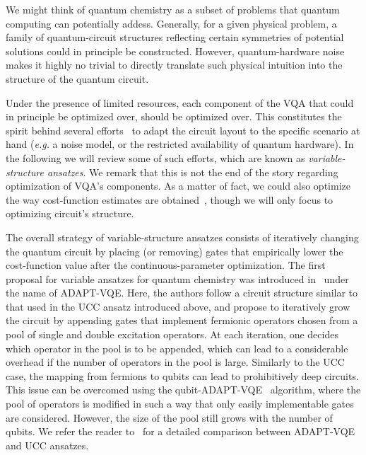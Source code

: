We might think of quantum chemistry as a subset of problems that quantum computing can potentially addess. Generally, for a given physical problem, a family of quantum-circuit structures reflecting certain symmetries of potential solutions could in principle be constructed. However, quantum-hardware noise makes it highly no trivial to directly translate such physical intuition into the structure of the quantum circuit. %
\vspace{1cm}

Under the presence of limited resources, each component of the VQA that could in principle be optimized over, should be optimized over. This constitutes the spirit behind several efforts~\cite{grimsley2019adaptive,tang2019qubit,zhang2021mutual, rattew2019domain,chivilikhin2020mog, cincio2021machine, cincio2018learning,du2020quantum,zhang2020differentiable} to adapt the circuit layout to the specific scenario at hand (\textit{e.g.} a noise model, or the restricted availability of quantum hardware). In the following we will review some of such efforts, which are known as \textit{variable-structure ansatzes}. We remark that this is not the end of the story regarding optimization of VQA's components. As a matter of fact, we could also optimize the way cost-function estimates are obtained~\cite{algorithmiq1,algorithmiq2}, though we will only focus to optimizing circuit's structure.

The overall strategy of variable-structure ansatzes consists of iteratively changing the quantum circuit by placing (or removing) gates that empirically lower the cost-function value after the continuous-parameter optimization. The first proposal for variable ansatzes for quantum chemistry was introduced in~\cite{grimsley2019adaptive} under the name of ADAPT-VQE. Here, the authors follow a circuit structure similar to that used in the UCC ansatz introduced above, and propose to iteratively grow the circuit by appending gates that implement fermionic operators chosen from a pool of single and double excitation operators. At each iteration, one decides which operator in the pool is to be appended, which can lead to a considerable overhead if the number of operators in the pool is large. Similarly to the UCC case, the mapping from fermions to qubits can lead to prohibitively deep circuits. This issue can be overcomed using the qubit-ADAPT-VQE~\cite{tang2019qubit} algorithm, where the pool of operators is modified in such a way that only easily implementable gates are considered. However, the size of the pool still grows with the number of qubits. We refer the reader to~\cite{claudino2020benchmarking} for a detailed comparison between ADAPT-VQE and UCC ansatzes.

